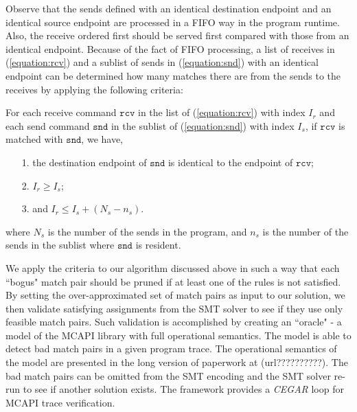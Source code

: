 Observe that the sends defined with an identical destination endpoint and an identical source endpoint are processed in a FIFO way in the program runtime. Also, the receive ordered first should be served first compared with those from an identical endpoint. Because of the fact of FIFO processing, a list of receives in (\ref{equation:rcv}) and a sublist of sends in (\ref{equation:snd}) with an identical endpoint can be determined how many matches there are from the sends to the receives by applying the following criteria:

For each receive command $\mathtt{rcv}$ in the list of (\ref{equation:rcv}) with index $I_r$ and each send command $\mathtt{snd}$ in the sublist of (\ref{equation:snd}) with index $I_s$, if $\mathtt{rcv}$ is matched with $\mathtt{snd}$, we have,
\begin{itemize}
\item[1.] the destination endpoint of $\mathtt{snd}$ is identical to the endpoint of $\mathtt{rcv}$;
\item[2.] $I_r \geq I_s$;
\item[3.] and $I_r \leq I_s + (N_s - n_s)$.
\end{itemize}
where $N_s$ is the number of the sends in the program, and $n_s$ is the number of the sends in the sublist where $\mathtt{snd}$ is resident.

We apply the criteria to our algorithm discussed above in such a way that each ``bogus" match pair should be pruned if at least one of the rules is not satisfied. By setting the over-approximated set of match pairs as input to our solution, we then validate satisfying assignments from the SMT solver to see if they use only feasible match pairs. Such validation is accomplished by creating an ``oracle" - a model of the MCAPI library with full operational semantics. The model is able to detect bad match pairs in a given program trace. The operational semantics of the model are presented in the long version of paperwork at (url??????????). The bad match pairs can be omitted from the SMT encoding and the SMT solver re-run to see if another solution exists. The framework provides a \textit{CEGAR} loop for MCAPI trace verification.
